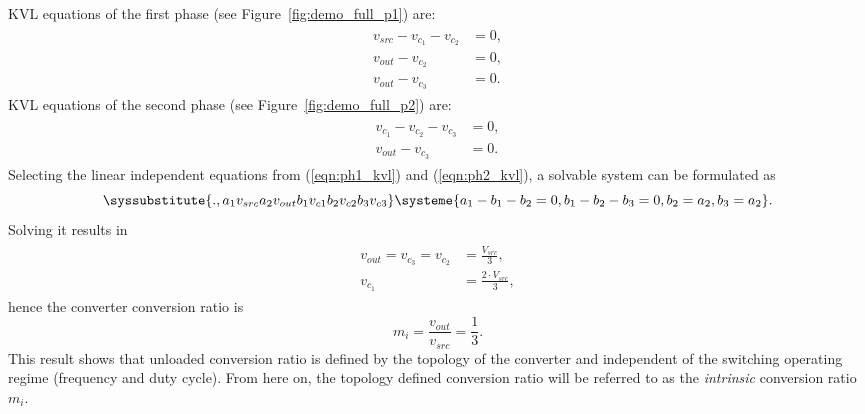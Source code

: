 KVL equations of the first phase (see Figure~\ref{fig:demo_full_p1}) are:
\begin{align}
\label{eqn:ph1_kvl}
\begin{split}
  v_{src} - v_{c_1} - v_{c_2} &=0, \\
  v_{out} - v_{c_2}  &=0,\\
  v_{out} - v_{c_3}  &=0.
\end{split}
\end{align}
KVL equations of the second phase (see Figure~\ref{fig:demo_full_p2}) are:
\begin{align}
\label{eqn:ph2_kvl}
\begin{split}
  v_{c_1} - v_{c_2} - v_{c_3} &=0, \\
  v_{out} - v_{c_3}  &=0.
\end{split}
\end{align}
Selecting the linear independent equations from (\ref{eqn:ph1_kvl}) and (\ref{eqn:ph2_kvl}), a solvable system can be formulated as
\begin{equation}
  \syssubstitute{.,{a_1}{v_{src}}{a_2}{v_{out}}{b_1}{v_{c1}}{b_2}{v_{c2}}{b_3}{v_{c3}}}
  \systeme{
    a_1  - b_1 -b_2  = 0,
    b_1 - b_2 - b_3  = 0,
    b_2   = a_2,
    b_3  =  a_2}.
    \label{eqn:sys_kvl}
\end{equation}
Solving it results in
\begin{align}
\label{eqn:sol_kvl}
\begin{split}
  v_{out} =  v_{c_3} = v_{c_2} &=\frac{V_{src}}{3} , \\
  v_{c_1} &=\frac{2 \cdot V_{src}}{3} ,
\end{split}
\end{align}
hence the converter conversion ratio is
\begin{equation}
\label{eqn:m_kvl}
m_i = \frac{v_{out}}{v_{src}} = \frac{1}{3}.
\end{equation}
This result shows that unloaded conversion ratio is defined by the topology of the converter and independent of the switching operating regime (frequency and duty cycle). From here on, the topology defined conversion ratio will be referred to as the \emph{intrinsic} conversion ratio $m_i$.

